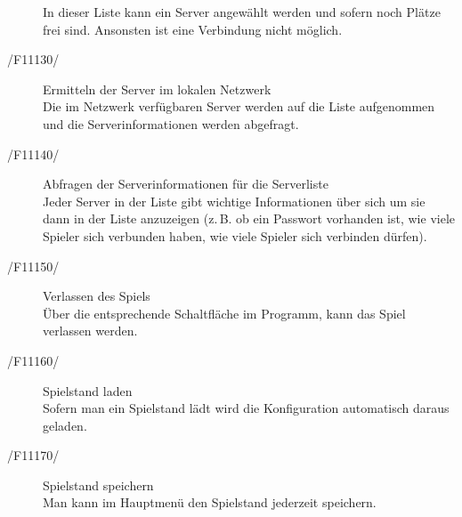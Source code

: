 \documentclass[a4paper,10pt]{article}
\begin{document}
\begin{description}
In dieser Liste kann ein Server angewählt werden und sofern noch Plätze frei sind. Ansonsten ist eine Verbindung nicht möglich.
\item[/F11130/] Ermitteln der Server im lokalen Netzwerk \\
Die im Netzwerk verfügbaren Server werden auf die Liste aufgenommen und die Serverinformationen werden abgefragt.
\item[/F11140/] Abfragen der Serverinformationen für die Serverliste \\
Jeder Server in der Liste gibt wichtige Informationen über sich um sie dann in der Liste anzuzeigen (z.\,B. ob ein Passwort vorhanden ist, wie viele Spieler sich verbunden haben, wie viele Spieler sich verbinden dürfen).
\item[/F11150/] Verlassen des Spiels \\
Über die entsprechende Schaltfläche im Programm, kann das Spiel verlassen werden.
\item[/F11160/] Spielstand laden \\
Sofern man ein Spielstand lädt wird die Konfiguration automatisch daraus geladen.
\item[/F11170/] Spielstand speichern \\
Man kann im Hauptmenü den Spielstand jederzeit speichern.
\end{description}
\end{document}
